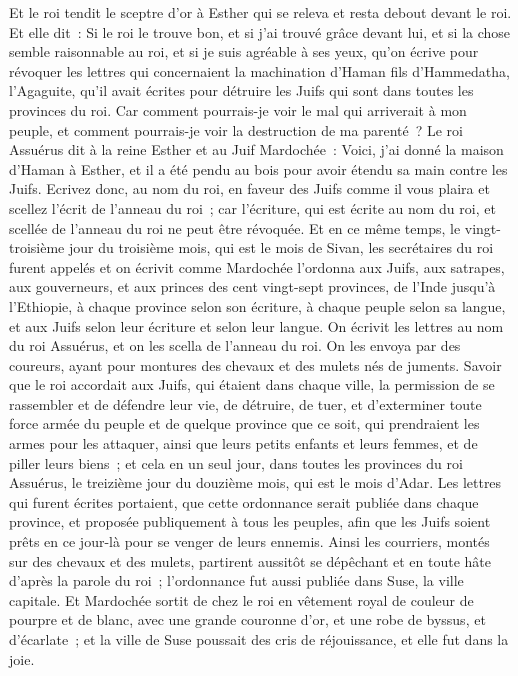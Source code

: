 \begin{multicols}{2}
Et le roi tendit le sceptre d'or à Esther qui se releva et resta debout devant le roi.
Et elle dit~: Si le roi le trouve bon, et si j'ai trouvé grâce devant lui, et si la chose semble raisonnable au roi, et si je suis agréable à ses yeux, qu'on écrive pour révoquer les lettres qui concernaient la machination d'Haman fils d'Hammedatha, l'Agaguite, qu'il avait écrites pour détruire les Juifs qui sont dans toutes les provinces du roi.
Car comment pourrais-je voir le mal qui arriverait à mon peuple, et comment pourrais-je voir la destruction de ma parenté~?
Le roi Assuérus dit à la reine Esther et au Juif Mardochée~: Voici, j'ai donné la maison d'Haman à Esther, et il a été pendu au bois pour avoir étendu sa main contre les Juifs.
Ecrivez donc, au nom du roi, en faveur des Juifs comme il vous plaira et scellez l'écrit de l'anneau du roi~; car l'écriture, qui est écrite au nom du roi, et scellée de l'anneau du roi ne peut être révoquée.
Et en ce même temps, le vingt-troisième jour du troisième mois, qui est le mois de Sivan, les secrétaires du roi furent appelés et on écrivit comme Mardochée l'ordonna aux Juifs, aux satrapes, aux gouverneurs, et aux princes des cent vingt-sept provinces, de l'Inde jusqu'à l'Ethiopie, à chaque province selon son écriture, à chaque peuple selon sa langue, et aux Juifs selon leur écriture et selon leur langue.
On écrivit les lettres au nom du roi Assuérus, et on les scella de l'anneau du roi. On les envoya par des coureurs, ayant pour montures des chevaux et des mulets nés de juments.
Savoir que le roi accordait aux Juifs, qui étaient dans chaque ville, la permission de se rassembler et de défendre leur vie, de détruire, de tuer, et d'exterminer toute force armée du peuple et de quelque province que ce soit, qui prendraient les armes pour les attaquer, ainsi que leurs petits enfants et leurs femmes, et de piller leurs biens~;
et cela en un seul jour, dans toutes les provinces du roi Assuérus, le treizième jour du douzième mois, qui est le mois d'Adar.
Les lettres qui furent écrites portaient, que cette ordonnance serait publiée dans chaque province, et proposée publiquement à tous les peuples, afin que les Juifs soient prêts en ce jour-là pour se venger de leurs ennemis.
Ainsi les courriers, montés sur des chevaux et des mulets, partirent aussitôt se dépêchant et en toute hâte d'après la parole du roi~; l'ordonnance fut aussi publiée dans Suse, la ville capitale.
Et Mardochée sortit de chez le roi en vêtement royal de couleur de pourpre et de blanc, avec une grande couronne d'or, et une robe de byssus, et d'écarlate~; et la ville de Suse poussait des cris de réjouissance, et elle fut dans la joie.

\end{multicols}
